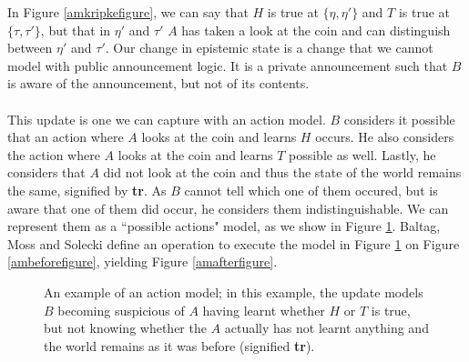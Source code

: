\documentclass[12pt, a4paper, titlepage]{scrartcl}
\begin{document}
In Figure \ref{amkripkefigure}, we can say that $H$ is true at $\{\eta,\eta'\}$ and $T$ is
true at $\{\tau,\tau'\}$, but that in $\eta'$ and $\tau'$ $A$ has taken a look
at the coin and can distinguish between $\eta'$ and $\tau'$.
Our change in epistemic state is a change that we cannot model with public
announcement logic.
It is a private announcement such that $B$ is aware of the announcement, but not
of its contents.\\
\\
This update is one we can capture with an action model.
$B$ considers it possible that an action where $A$ looks at the coin and learns
$H$ occurs.
He also considers the action where $A$ looks at the coin and learns $T$ possible
as well.
Lastly, he considers that $A$ did not look at the coin and thus the state of the
world remains the same, signified by {\bf tr}.
As $B$ cannot tell which one of them occured, but is aware that one of them did
occur, he considers them indistinguishable.
We can represent them as a ``possible actions" model, as we show in Figure
\ref{amprivatea}.
Baltag, Moss and Solecki define an operation to execute the model in Figure
\ref{amprivatea} on Figure \ref{ambeforefigure}, yielding Figure
\ref{amafterfigure}\cite{baltag1998lpa}.

\begin{figure}[H]
\centering
{}
\caption{An example of an action model; in this example, the update models $B$
becoming suspicious of $A$ having learnt whether $H$ or $T$ is true, but not
knowing whether the $A$ actually has not learnt anything and the world remains
as it was before (signified {\bf tr}).}
\label{amprivatea}
\end{figure}
\end{document}
